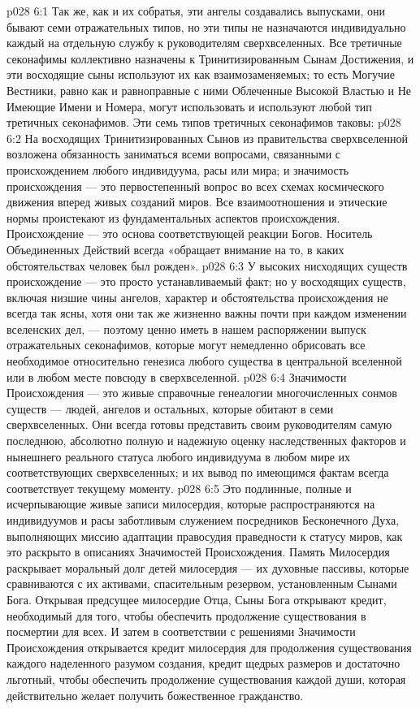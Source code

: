 \vs p028 6:1 Так же, как и их собратья, эти ангелы создавались выпусками, они бывают семи отражательных типов, но эти типы не назначаются индивидуально каждый на отдельную службу к руководителям сверхвселенных. Все третичные секонафимы коллективно назначены к Тринитизированным Сынам Достижения, и эти восходящие сыны используют их как взаимозаменяемых; то есть Могучие Вестники, равно как и равноправные с ними Облеченные Высокой Властью и Не Имеющие Имени и Номера, могут использовать и используют любой тип третичных секонафимов. Эти семь типов третичных секонафимов таковы:
\vs p028 6:2 \pc {}\bibnobreakspace {} На восходящих Тринитизированных Сынов из правительства сверхвселенной возложена обязанность заниматься всеми вопросами, связанными с происхождением любого индивидуума, расы или мира; и значимость происхождения --- это первостепенный вопрос во всех схемах космического движения вперед живых созданий миров. Все взаимоотношения и этические нормы проистекают из фундаментальных аспектов происхождения. Происхождение --- это основа соответствующей реакции Богов. Носитель Объединенных Действий всегда «обращает внимание на то, в каких обстоятельствах человек был рожден».
\vs p028 6:3 У высоких нисходящих существ происхождение --- это просто устанавливаемый факт; но у восходящих существ, включая низшие чины ангелов, характер и обстоятельства происхождения не всегда так ясны, хотя они так же жизненно важны почти при каждом изменении вселенских дел, --- поэтому ценно иметь в нашем распоряжении выпуск отражательных секонафимов, которые могут немедленно обрисовать все необходимое относительно генезиса любого существа в центральной вселенной или в любом месте повсюду в сверхвселенной.
\vs p028 6:4 Значимости Происхождения --- это живые справочные генеалогии многочисленных сонмов существ --- людей, ангелов и остальных, которые обитают в семи сверхвселенных. Они всегда готовы представить своим руководителям самую последнюю, абсолютно полную и надежную оценку наследственных факторов и нынешнего реального статуса любого индивидуума в любом мире их соответствующих сверхвселенных; и их вывод по имеющимся фактам всегда соответствует текущему моменту.
\vs p028 6:5 \pc {}\bibnobreakspace {} Это подлинные, полные и исчерпывающие живые записи милосердия, которые распространяются на индивидуумов и расы заботливым служением посредников Бесконечного Духа, выполняющих миссию адаптации правосудия праведности к статусу миров, как это раскрыто в описаниях Значимостей Происхождения. Память Милосердия раскрывает моральный долг детей милосердия --- их духовные пассивы, которые сравниваются с их активами, спасительным резервом, установленным Сынами Бога. Открывая предсущее милосердие Отца, Сыны Бога открывают кредит, необходимый для того, чтобы обеспечить продолжение существования в посмертии для всех. И затем в соответствии с решениями Значимости Происхождения открывается кредит милосердия для продолжения существования каждого наделенного разумом создания, кредит щедрых размеров и достаточно льготный, чтобы обеспечить продолжение существования каждой души, которая действительно желает получить божественное гражданство.
